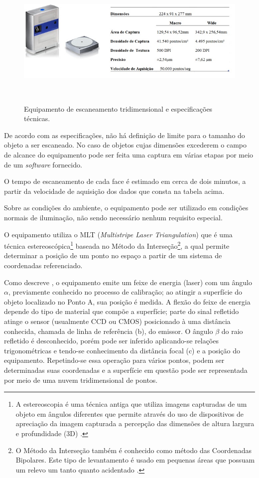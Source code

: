 \begin{figure}[!ht]
\centering
{\includegraphics[scale=1]{figures/scanner.jpg}}\\
\caption{Equipamento de escaneamento tridimensional e especificações técnicas.}
\\
\label{Fig:scanner}
\end{figure}

De acordo com as especificações, não há definição de limite para o tamanho do objeto a ser escaneado. No caso de objetos cujas dimensões excederem o campo de alcance do equipamento pode ser feita uma captura em várias etapas por meio de um \emph{software} fornecido. 

O tempo de escaneamento de cada face é estimado em cerca de dois minutos, a partir da velocidade de aquisição dos dados que consta na tabela acima. 

Sobre as condições do ambiente, o equipamento pode ser utilizado em condições normais de iluminação, não sendo necessário nenhum requisito especial. 

O equipamento utiliza o MLT (\emph{Multistripe Laser Triangulation}) que é uma técnica estereoscópica\footnote{A estereoscopia é uma técnica antiga que utiliza imagens capturadas de um objeto em ângulos diferentes que permite através do uso de dispositivos de apreciação da imagem capturada a percepção das dimensões de altura largura e profundidade (3D) \cite{coutinho}.} baseada no Método da Interseção\footnote{O Método da Interseção também é conhecido como método das Coordenadas Bipolares. Este tipo de levantamento é usado em pequenas áreas que possuam um relevo um tanto quanto acidentado \cite{espartel}.}, a qual permite determinar a posição de um ponto no espaço a partir de um sistema de coordenadas referenciado.

Como descreve , o equipamento emite um feixe de energia (laser) com um ângulo $\alpha$, previamente conhecido no processo de calibração; ao atingir a superfície do objeto localizado no Ponto A, sua posição é medida. A flexão do feixe de energia depende do tipo de material que compõe a superfície; parte do sinal refletido atinge o sensor (usualmente CCD ou CMOS) posicionado à uma distância conhecida, chamada de linha de referência (b), do emissor. O ângulo $\beta$ do raio refletido é desconhecido, porém pode ser inferido aplicando-se relações trigonométricas e tendo-se conhecimento da distância focal (c) e a posição do equipamento. Repetindo-se essa operação para vários pontos, podem ser determinadas suas coordenadas e a superfície em questão pode ser representada por meio de uma nuvem tridimensional de pontos.

